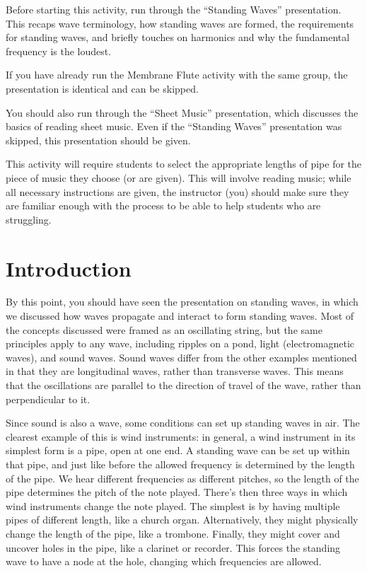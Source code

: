 \documentclass{article}
\begin{document}
\begin{instructoronly}
    Before starting this activity, run through the ``Standing Waves'' presentation. This recaps wave terminology, how standing waves are formed, the requirements for standing waves, and briefly touches on harmonics and why the fundamental frequency is the loudest.

    If you have already run the Membrane Flute activity with the same group, the presentation is identical and can be skipped.

    You should also run through the ``Sheet Music'' presentation, which discusses the basics of reading sheet music. Even if the ``Standing Waves'' presentation was skipped, this presentation should be given.

    This activity will require students to select the appropriate lengths of pipe for the piece of music they choose (or are given). This will involve reading music; while all necessary instructions are given, the instructor (you) should make sure they are familiar enough with the process to be able to help students who are struggling.
\end{instructoronly}

\section{Introduction}
 
By this point, you should have seen the presentation on standing waves, in which we discussed how waves propagate and interact to form standing waves. Most of the concepts discussed were framed as an oscillating string, but the same principles apply to any wave, including ripples on a pond, light (electromagnetic waves), and sound waves. Sound waves differ from the other examples mentioned in that they are longitudinal waves, rather than transverse waves. This means that the oscillations are parallel to the direction of travel of the wave, rather than perpendicular to it. 

Since sound is also a wave, some conditions can set up standing waves in air. The clearest example of this is wind instruments: in general, a wind instrument in its simplest form is a pipe, open at one end. A standing wave can be set up within that pipe, and just like before the allowed frequency is determined by the length of the pipe. We hear different frequencies as different pitches, so the length of the pipe determines the pitch of the note played. There's then three ways in which wind instruments change the note played. The simplest is by having multiple pipes of different length, like a church organ. Alternatively, they might physically change the length of the pipe, like a trombone. Finally, they might cover and uncover holes in the pipe, like a clarinet or recorder. This forces the standing wave to have a node at the hole, changing which frequencies are allowed.
\end{document}
